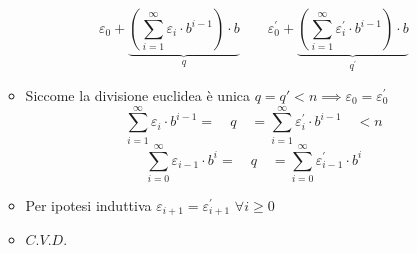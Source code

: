 \documentclass[10pt]{article}
\begin{document}
\begin{itemize}
\begin{itemize}
$$\displaystyle{\varepsilon_0 + \underbrace{\left(\sum_{i=1}^{\infty} \varepsilon_i \cdot b^{i-1} \right) \cdot b}_{q} \quad \quad \varepsilon^{'}_0 + \underbrace{\left(\sum_{i=1}^{\infty} \varepsilon^{'}_i \cdot b^{i-1} \right) \cdot b}_{q^{'}}}$$
\item
Siccome la divisione euclidea è unica $q = q' < n \implies \varepsilon_0 = \varepsilon^{'}_0$
$$ \displaystyle{\sum_{i = 1}^{\infty} \varepsilon_i \cdot b^{i -1} = \quad q \quad = \sum_{i = 1}^{\infty} \varepsilon^{'}_i \cdot b^{i -1}  \quad < n}$$
$$\!\!\!\!\!\!\!\!\!\!\!\!\!\!\!\!\sum_{i = 0}^{\infty} \varepsilon_{i-1} \cdot b^{i} = \quad q \quad = \sum_{i = 0}^{\infty} \varepsilon^{'}_{i-1} \cdot b^{i}$$
\item
Per ipotesi induttiva $\varepsilon_{i+1} = \varepsilon^{'}_{i+1} \,\,\forall i \geq 0$
\item
$C.V.D.$
\end{itemize}
\end{itemize}
\end{document}
